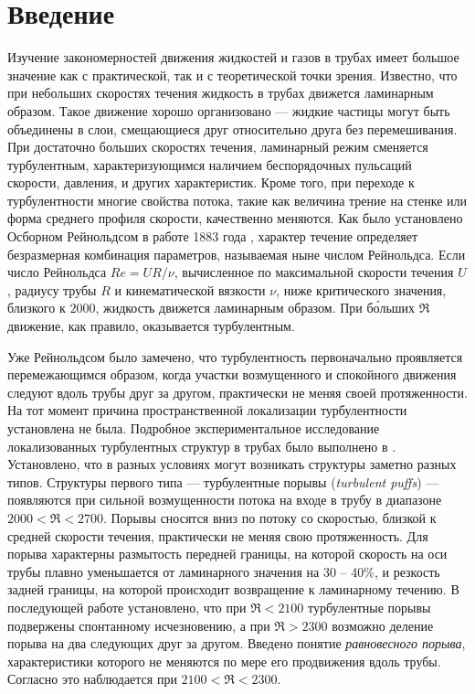 \renewcommand \thechapter {i}
\thispagestyle{empty}
\phantom{.}
\chapter*{Введение}


Изучение закономерностей движения жидкостей и газов в трубах имеет большое значение как с практической, так и с теоретической точки зрения. Известно, что при небольших скоростях течения жидкость в трубах движется ламинарным образом. Такое движение хорошо организовано --- жидкие частицы могут быть объединены в слои, смещающиеся друг относительно друга без перемешивания. При достаточно больших скоростях течения, ламинарный режим сменяется турбулентным, характеризующимся наличием беспорядочных пульсаций скорости, давления, и других характеристик. Кроме того, при переходе к турбулентности многие свойства потока, такие как величина трение на стенке или форма среднего профиля скорости, качественно меняются. Как было установлено Осборном Рейнольдсом в работе 1883 года \cite{Reynolds1883}, характер течение определяет безразмерная комбинация параметров, называемая ныне числом Рейнольдса. Если число Рейнольдса $Re=UR/\nu$, вычисленное по максимальной скорости течения $U$, радиусу трубы $R$ и кинематической вязкости $\nu$, ниже критического значения, близкого к $2000$, жидкость движется ламинарным образом. При б\'{о}льших $\Re$ движение, как правило, оказывается турбулентным.

Уже Рейнольдсом было замечено, что турбулентность первоначально проявляется перемежающимся образом, когда участки возмущенного и спокойного движения следуют вдоль трубы друг за другом, практически не меняя своей протяженности. На тот момент причина пространственной локализации турбулентности установлена не была. Подробное экспериментальное исследование локализованных турбулентных структур в трубах было выполнено в \cite{Wygnanski1973}. Установлено, что в разных условиях могут возникать структуры заметно разных типов. Структуры первого типа --- турбулентные порывы ({\it turbulent puffs}) --- появляются при сильной возмущенности потока на входе в трубу в диапазоне $2000<\Re<2700$. Порывы сносятся вниз по потоку со скоростью, близкой к средней скорости течения, практически не меняя свою протяженность. Для порыва характерны размытость передней границы, на которой скорость на оси трубы плавно уменьшается от ламинарного значения на 30 -- 40\%, и резкость задней границы, на которой происходит возвращение к ламинарному течению. В последующей работе \cite{Wygnanski1975} установлено, что при $\Re<2100$ турбулентные порывы подвержены спонтанному исчезновению, а при $\Re>2300$ возможно деление порыва на два следующих друг за другом. Введено понятие {\it равновесного порыва}, характеристики которого не меняются по мере его продвижения вдоль трубы. Согласно \cite{Wygnanski1975} это наблюдается при $2100 < \Re < 2300$. 

